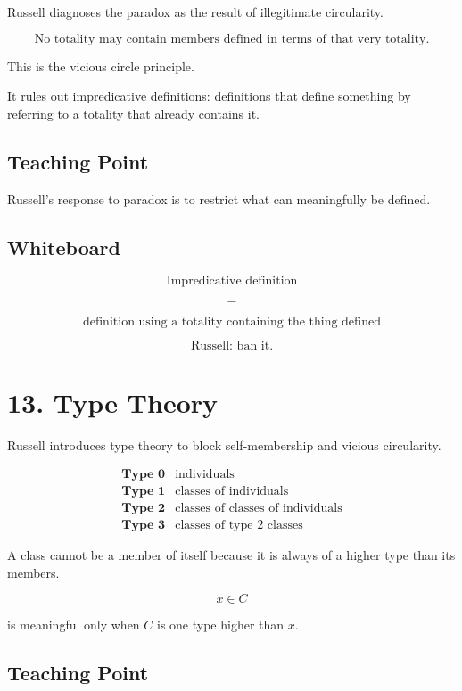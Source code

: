\documentclass[11pt]{article}
\begin{document}
Russell diagnoses the paradox as the result of illegitimate circularity.

\[
\boxed{
\text{No totality may contain members defined in terms of that very totality.}
}
\]

This is the vicious circle principle.

It rules out impredicative definitions: definitions that define something by referring to a
totality that already contains it.

\subsection*{Teaching Point}

Russell's response to paradox is to restrict what can meaningfully be defined.

\subsection*{Whiteboard}

\[
\text{Impredicative definition}
\]

\[
=
\]

\[
\text{definition using a totality containing the thing defined}
\]

\[
\text{Russell: ban it.}
\]

\section*{13. Type Theory}

Russell introduces type theory to block self-membership and vicious circularity.

\[
\begin{array}{c|c}
\textbf{Type 0} & \text{individuals} \\
\textbf{Type 1} & \text{classes of individuals} \\
\textbf{Type 2} & \text{classes of classes of individuals} \\
\textbf{Type 3} & \text{classes of type 2 classes}
\end{array}
\]

A class cannot be a member of itself because it is always of a higher type than its members.

\[
x \in C
\]

is meaningful only when \(C\) is one type higher than \(x\).

\subsection*{Teaching Point}
\end{document}
